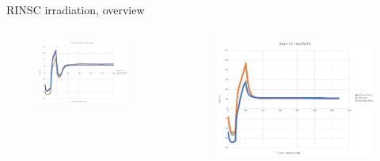 \documentclass{beamer}
\begin{document}
\begin{frame}{RINSC irradiation, overview}
    \begin{columns}
        \begin{figure}
          \includegraphics[width=0.9\textwidth]{plots/Round5_temp_profile.png}
        \end{figure}
        \begin{figure}
          \includegraphics[width=.9\textwidth]{plots/Round6_temp_profile.png}
        \end{figure}
    \end{columns}


\end{frame}
\end{document}
